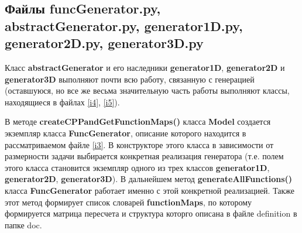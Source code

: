 \documentclass[a4paper]{article}
\begin{document}
\newpage
\subsection{\Large Файлы funcGenerator.py, abstractGenerator.py, generator1D.py, generator2D.py, generator3D.py}
Класс {\bf abstractGenerator} и его наследники {\bf generator1D}, {\bf generator2D} и {\bf generator3D} выполняют почти всю работу, связанную с генерацией (остав\-шу\-ю\-ся, но все же весьма значительную часть работы выполняют классы, на\-хо\-дя\-щи\-е\-ся в файлах \ref{i4}, \ref{i5}).

В методе {\bf createCPPandGetFunctionMaps()} класса {\bf Model} со\-зда\-ет\-ся экземпляр класса {\bf FuncGenerator}, описание которого находится в рассматриваемом файле \ref{i3}. В конструкторе этого класса в зависимости от размерности задачи выбирается конкретная реализация генератора (т.е. полем этого класса становится экземпляр одного из трех классов {\bf generator1D}, {\bf generator2D}, {\bf generator3D}). В дальнейшем метод {\bf generateAllFunctions()} класса {\bf FuncGenerator} работает именно с этой конкретной реализацией. Также этот метод формирует список словарей {\bf functionMaps}, по которому формируется матрица пересчета и структура которго описана в файле definition в папке doc.
\end{document}
